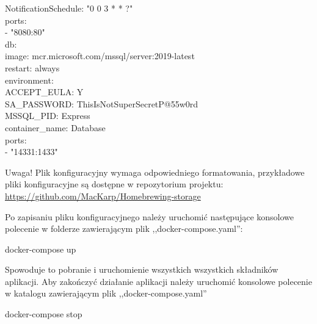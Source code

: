 \documentclass[12pt,a4paper]{article}
\begin{document}
\begin{tcolorbox}[minipage,colback=white,arc=0pt,outer arc=0pt, fontupper=\footnotesize]
\begin{tabbing}
            			\>\>\> NotificationSchedule: "0 0 3 * * ?" \\
        				\>\> ports: \\
            			\>\>\> - "8080:80" \\
    					\> db: \\
						\>\> image: mcr.microsoft.com/mssql/server:2019-latest \\
        				\>\> restart: always \\
        				\>\> environment: \\
            			\>\>\> ACCEPT\_EULA: Y \\
            			\>\>\> SA\_PASSWORD: ThisIsNotSuperSecretP@55w0rd \\
            			\>\>\> MSSQL\_PID: Express \\
        				\>\> container\_name: Database \\
        				\>\> ports: \\
						\>\>\> - "14331:1433"
					\end{tabbing}
				\end{tcolorbox}	
				\begin{tcolorbox}[minipage,colback=white,arc=0pt,outer arc=0pt, fontupper=\scriptsize]
					Uwaga! Plik konfiguracyjny wymaga odpowiedniego formatowania, przykładowe pliki konfiguracyjne są dostępne w repozytorium projektu:
					\url{https://github.com/MacKarp/Homebrewing-storage}
				\end{tcolorbox}
				Po zapisaniu pliku konfiguracyjnego należy uruchomić następujące konsolowe polecenie w folderze zawierającym plik ,,docker-compose.yaml'':
				\begin{tcolorbox}[minipage,colback=white,arc=0pt,outer arc=0pt, fontupper=\scriptsize]
					docker-compose up
				\end{tcolorbox}
				Spowoduje to pobranie i uruchomienie wszystkich wszystkich składników aplikacji. Aby zakończyć działanie aplikacji należy uruchomić konsolowe
				polecenie w katalogu zawierającym plik ,,docker-compose.yaml''  	
				\begin{tcolorbox}[minipage,colback=white,arc=0pt,outer arc=0pt, fontupper=\scriptsize]
					docker-compose stop			
				\end{tcolorbox}

	\newpage
	
\end{document}
